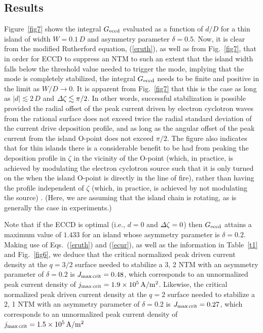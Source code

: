 \documentclass{iopjournal}
\begin{document}
{\subsection{Results}
Figure~\ref{fig7} shows the integral $G_{\rm eccd}$ evaluated as a function of $d/D$ for a thin island of width $W=0.1\,D$ and asymmetry parameter
$\delta=0.5$. Now, it is clear from the modified Rutherford equation, (\ref{eruth}), as well as from  Fig.~\ref{fig7}, that in order for ECCD to suppress an NTM to
such an extent that the island width falls below the threshold value needed to trigger the mode, implying that the mode is completely
stabilized, the integral $G_{\rm eccd}$ needs to be finite and positive in the limit as $W/D\rightarrow 0$. It is apparent  from Fig.~\ref{fig7} that this is the case
as long as $|d|\lesssim 2\,D$ and ${\mit\Delta}\zeta\lesssim \pi/2$. In other words, successful stabilization is possible provided  the radial
offset of the peak current driven by electron cyclotron waves from the rational surface does not exceed twice the radial standard deviation of the current drive deposition profile, 
and as long as the angular offset of the peak current from the island O-point does not exceed $\pi/2$. The figure also indicates that for thin islands
there is a considerable benefit to be had from peaking the deposition profile in $\zeta$ in the vicinity of the O-point (which, in practice, is achieved by
modulating the electron cyclotron source such that it is only turned on the when the island O-point is directly in the line of fire), rather than having the profile independent of
$\zeta$ (which, in practice, is achieved by not modulating the source) \cite{ece6}. (Here, we are assuming that the island chain is rotating, as is generally the case in experiments.) 

Note that if the ECCD is optimal
(i.e., $d=0$ and ${\mit\Delta}\zeta=0$) then $G_{\rm eccd}$ attains a maximum value of $1.433$ for an island whose asymmetry parameter is $\delta=0.2$. 
Making use of Eqs.~(\ref{eruth}) and (\ref{ecur}),  as well as the information in Table~\ref{t1} and Fig.~\ref{fig6}, 
we deduce that the critical normalized peak driven current density at the $q=3/2$ surface needed to stabilize a 3, 2 NTM with an asymmetry parameter of $\delta = 0.2$ is $J_{\rm max\,crit}= 0.48$, which corresponds
to an unnormalized peak current density of $j_{\rm max\,crit}= 1.9\times 10^5\,{\rm A/m^2}$. Likewise, the critical normalized peak driven current density at the $q=2$ surface needed to stabilize a 2, 1 NTM with an asymmetry parameter of $\delta = 0.2$ is $J_{\rm max\,crit}= 0.27$, which corresponds
to an unnormalized peak current density of $j_{\rm max\,crit}= 1.5\times 10^5\,{\rm A/m^2}$

}
\end{document}
